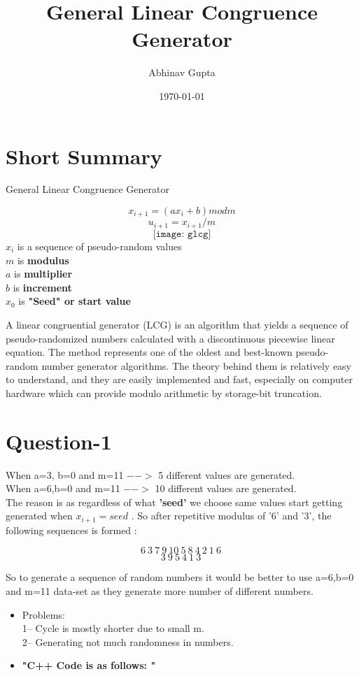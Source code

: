 \documentclass{article}
\title{\textbf{General Linear Congruence Generator}}
\author{Abhinav Gupta}
\date{\today}
\begin{document}
 \tableofcontents
\maketitle

\section{Short Summary}
 
General Linear Congruence Generator

\[x_{i+1}=(ax_i+b) mod m\]
\[u_{i+1}=x_{i+1}/m\]
\[\texttt{[image: glcg]}\]
\(x_i\) is a sequence of pseudo-random values\\
\(m\) is \textbf{modulus}\\
\(a\) is \textbf{multiplier}\\
\(b\) is \textbf{increment}\\
\(x_0\) is \textbf{"Seed" or start value}


A linear congruential generator (LCG) is an algorithm that yields a sequence of pseudo-randomized numbers calculated with a discontinuous piecewise linear equation. The method represents one of the oldest and best-known pseudo-random number generator algorithms. The theory behind them is relatively easy to understand, and they are easily implemented and fast, especially on computer hardware which can provide modulo arithmetic by storage-bit truncation.
\section{Question-1}
 
When a=3, b=0 and m=11 \(-->\) 5 different values are generated.\\
When a=6,b=0 and m=11 \(-->\) 10 different values are generated.\\
The reason is as regardless of what \textbf{'seed'} we choose same values start getting generated when \(x_{i+1}=seed\) . So after repetitive modulus of '6' and '3', the following sequences is formed :

\[6\ 3\ 7\ 9\ 10\ 5\ 8\ 4\ 2\ 1\ 6\ \]
\[3\ 9\ 5\ 4\ 1\ 3\ \]

So to generate a sequence of random numbers it would be better to use  a=6,b=0 and m=11 data-set as they generate more number of different numbers.
\begin{itemize}
\item Problems:\\
1-- Cycle is mostly shorter due to small m.\\
2-- Generating not much randomness in numbers.\\


\item \textbf{"C++  Code is as follows: "}
\end{itemize}
\vspace{5mm}
\end{document}
